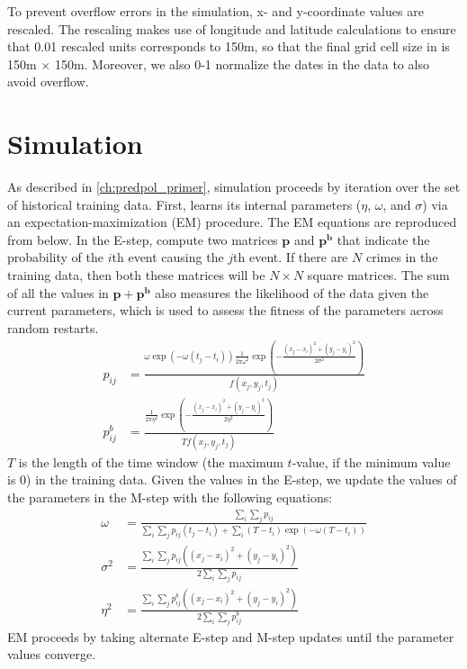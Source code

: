 To prevent overflow errors in the \pp simulation, x- and y-coordinate values are rescaled. The rescaling makes use of longitude and latitude calculations to ensure that 0.01 rescaled units corresponds to 150m, so that the final grid cell size in \pp is 150m $\times$ 150m. Moreover, we also 0-1 normalize the dates in the data to also avoid overflow.

\section{\pp Simulation}

As described in \autoref{ch:predpol_primer}, \pp simulation proceeds by iteration over the set of historical training data. First, \pp learns its internal parameters ($\eta$, $\omega$, and $\sigma$) via an expectation-maximization (EM) procedure. The EM equations are reproduced from \citet{mohler_marked_2014} below. In the E-step, compute two matrices $\mathbf{p}$ and $\mathbf{p^b}$ that indicate the probability of the $i$th event causing the $j$th event. If there are $N$ crimes in the training data, then both these matrices will be $N \times N$ square matrices. The sum of all the values in $\mathbf{p} + \mathbf{p^b}$ also measures the likelihood of the data given the current parameters, which is used to assess the fitness of the parameters across random restarts.
\begin{align}
    p_{ij} &= \frac{
        \omega \exp\left(-\omega(t_j - t_i)\right)
        \frac{1}{2 \pi \omega^2} \exp\left(
            -\frac{(x_j - x_i)^2 + (y_j - y_i)^2}{2\sigma^2}
        \right)
    }{f(x_j, y_j, t_j)}\\
    p^b_{ij} &= \frac{
        \frac{1}{2 \pi \eta^2} \exp\left(
            -\frac{(x_j - x_i)^2 + (y_j - y_i)^2}{2\eta^2}
        \right)
    }{T f(x_j, y_j, t_j)}
\end{align}
$T$ is the length of the time window (the maximum $t$-value, if the minimum value is 0) in the training data. Given the values in the E-step, we update the values of the parameters in the M-step with the following equations:
\begin{align}
    \omega &= \frac{\sum_i \sum_j p_{ij}}{
        \sum_i \sum_j p_{ij} (t_j - t_i) + 
        \sum_i (T - t_i) \exp(-\omega(T - t_i))
    }\\
    \sigma^2 &= \frac{
        \sum_i \sum_j p_{ij} \left(
            (x_j - x_i)^2 + (y_j - y_i)^2
        \right)
    }{2 \sum_i \sum_j p_{ij}}\\
    \eta^2 &= \frac{
        \sum_i \sum_j p^b_{ij} \left(
            (x_j - x_i)^2 + (y_j - y_i)^2
        \right)
    }{2 \sum_i \sum_j p^b_{ij}}
\end{align}
EM proceeds by taking alternate E-step and M-step updates until the parameter values converge.

